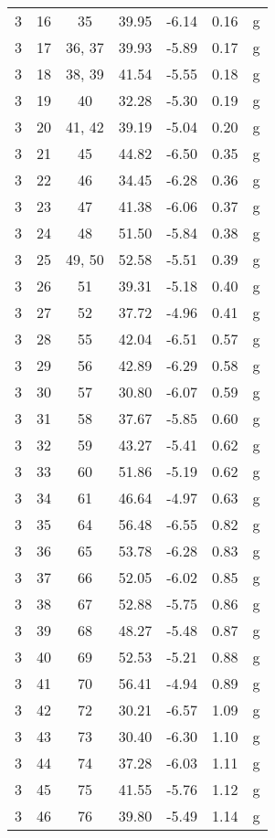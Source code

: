\begin{center}
\begin{longtable}{cccrrrc}
  3 & 16 & 35 & 39.95 & -6.14 &  0.16 & g\\
  3 & 17 & 36, 37 & 39.93 & -5.89 &  0.17 & g\\
  3 & 18 & 38, 39 & 41.54 & -5.55 &  0.18 & g\\
  3 & 19 & 40 & 32.28 & -5.30 &  0.19 & g\\
  3 & 20 & 41, 42 & 39.19 & -5.04 &  0.20 & g\\
  3 & 21 & 45 & 44.82 & -6.50 &  0.35 & g\\
  3 & 22 & 46 & 34.45 & -6.28 &  0.36 & g\\
  3 & 23 & 47 & 41.38 & -6.06 &  0.37 & g\\
  3 & 24 & 48 & 51.50 & -5.84 &  0.38 & g\\
  3 & 25 & 49, 50 & 52.58 & -5.51 &  0.39 & g\\
  3 & 26 & 51 & 39.31 & -5.18 &  0.40 & g\\
  3 & 27 & 52 & 37.72 & -4.96 &  0.41 & g\\
  3 & 28 & 55 & 42.04 & -6.51 &  0.57 & g\\
  3 & 29 & 56 & 42.89 & -6.29 &  0.58 & g\\
  3 & 30 & 57 & 30.80 & -6.07 &  0.59 & g\\
  3 & 31 & 58 & 37.67 & -5.85 &  0.60 & g\\
  3 & 32 & 59 & 43.27 & -5.41 &  0.62 & g\\
  3 & 33 & 60 & 51.86 & -5.19 &  0.62 & g\\
  3 & 34 & 61 & 46.64 & -4.97 &  0.63 & g\\
  3 & 35 & 64 & 56.48 & -6.55 &  0.82 & g\\
  3 & 36 & 65 & 53.78 & -6.28 &  0.83 & g\\
  3 & 37 & 66 & 52.05 & -6.02 &  0.85 & g\\
  3 & 38 & 67 & 52.88 & -5.75 &  0.86 & g\\
  3 & 39 & 68 & 48.27 & -5.48 &  0.87 & g\\
  3 & 40 & 69 & 52.53 & -5.21 &  0.88 & g\\
  3 & 41 & 70 & 56.41 & -4.94 &  0.89 & g\\
  3 & 42 & 72 & 30.21 & -6.57 &  1.09 & g\\
  3 & 43 & 73 & 30.40 & -6.30 &  1.10 & g\\
  3 & 44 & 74 & 37.28 & -6.03 &  1.11 & g\\
  3 & 45 & 75 & 41.55 & -5.76 &  1.12 & g\\
  3 & 46 & 76 & 39.80 & -5.49 &  1.14 & g\\

\end{longtable}
\end{center}

